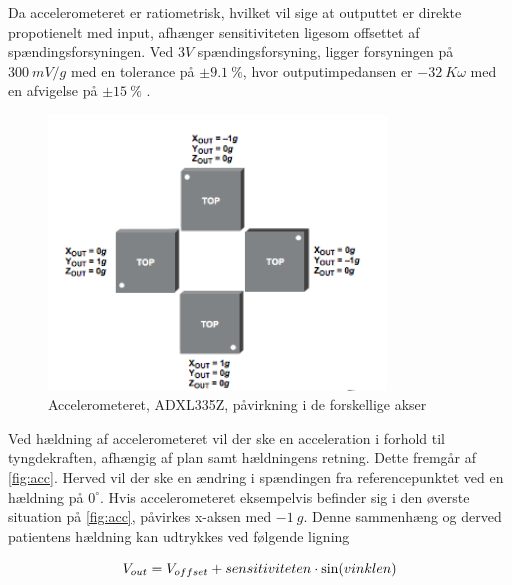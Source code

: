 Da accelerometeret er ratiometrisk, hvilket vil sige at outputtet er direkte propotienelt med input, afhænger sensitiviteten ligesom offsettet af spændingsforsyningen. Ved $3V$ spændingsforsyning, ligger forsyningen på $300~mV/g$ med en tolerance på $\pm 9.1~\%$, hvor outputimpedansen er $-32~K\omega$ med en afvigelse på $\pm 15~\%$ \citep{analogdevices2010}. 

\begin{figure}[H]
\centering
\includegraphics[width=0.8\textwidth]{figures/acc.png}
\caption{Accelerometeret, ADXL335Z, påvirkning i de forskellige akser}
\label{fig:acc}
\end{figure}

\noindent
Ved hældning af accelerometeret vil der ske en acceleration i forhold til tyngdekraften, afhængig af plan samt hældningens retning. Dette fremgår af \autoref{fig:acc}. Herved vil der ske en ændring i spændingen fra referencepunktet ved en hældning på $0^{\circ}$. Hvis accelerometeret eksempelvis befinder sig i den øverste situation på \autoref{fig:acc}, påvirkes x-aksen med $-1~g$. Denne sammenhæng og derved patientens hældning kan udtrykkes ved følgende ligning \citep{clifford2005}

\begin{equation} \label{equ:vinkler}
	V_{out} = V_{offset} + sensitiviteten \cdot \sin(vinklen) \\
\end{equation}



